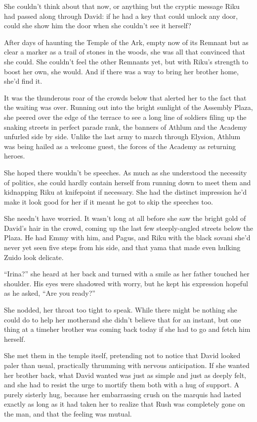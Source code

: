 She couldn't think about that now, or anything but the cryptic message Riku had passed along through David: if he had a key that could unlock any door, could she show him the door when she couldn't see it herself?

After days of haunting the Temple of the Ark, empty now of its Remnant but as clear a marker as a trail of stones in the woods, she was all that convinced that she could. She couldn't feel the other Remnants yet, but with Riku's strength to boost her own, she would. And if there was a way to bring her brother home, she'd find it.

It was the thunderous roar of the crowds below that alerted her to the fact that the waiting was over. Running out into the bright sunlight of the Assembly Plaza, she peered over the edge of the terrace to see a long line of soldiers filing up the snaking streets in perfect parade rank, the banners of Athlum and the Academy unfurled side by side. Unlike the last army to march through Elysion, Athlum was being hailed as a welcome guest, the forces of the Academy as returning heroes.

She hoped there wouldn't be speeches. As much as she understood the necessity of politics, she could hardly contain herself from running down to meet them and kidnapping Riku at knifepoint if necessary. She had the distinct impression he'd make it look good for her if it meant he got to skip the speeches too.

She needn't have worried. It wasn't long at all before she saw the bright gold of David's hair in the crowd, coming up the last few steeply-angled streets below the Plaza. He had Emmy with him, and Pagus, and Riku with the black sovani she'd never yet seen five steps from his side, and that yama that made even hulking Zuido look delicate.

``Irina?'' she heard at her back and turned with a smile as her father touched her shoulder. His eyes were shadowed with worry, but he kept his expression hopeful as he asked, ``Are you ready?''

She nodded, her throat too tight to speak. While there might be nothing she could do to help her mother\textemdash and she didn't believe that for an instant, but one thing at a time\textemdash her brother was coming back today if she had to go and fetch him herself.

She met them in the temple itself, pretending not to notice that David looked paler than usual, practically thrumming with nervous anticipation. If she wanted her brother back, what David wanted was just as simple and just as deeply felt, and she had to resist the urge to mortify them both with a hug of support. A purely sisterly hug, because her embarrassing crush on the marquis had lasted exactly as long as it had taken her to realize that Rush was completely gone on the man, and that the feeling was mutual.

